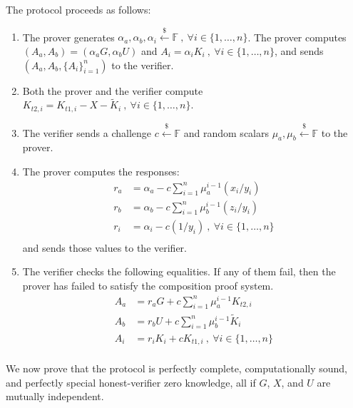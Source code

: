 \documentclass{article}
\theoremstyle{plain}
\theoremstyle{remark}
\begin{document}
The protocol proceeds as follows:
\begin{enumerate}
\item The prover generates $\alpha_a, \alpha_b, \alpha_i \xleftarrow{\$}\mathbb{F}\ ,\ \forall i\in\{1,\ldots,n\}$. The prover computes $(A_a, A_b) = (\alpha_a G, \alpha_b U)$ and $A_{i}=\alpha_i K_i\ ,\ \forall i\in\{1,\ldots,n\}$, and sends $(A_a, A_b, \{A_i\}_{i=1}^n)$ to the verifier.
\item Both the prover and the verifier compute $K_{t2,i} = K_{t1,i} - X - \tilde{K}_i\ ,\ \forall i\in\{1,\ldots,n\}$.
\item The verifier sends a challenge $c\xleftarrow{\$}\mathbb{F}$ and random scalars $\mu_a,\mu_b\xleftarrow{\$}\mathbb{F}$ to the prover.
\item The prover computes the responses:
\begin{align*}
r_{a} &= \alpha_a - c \sum_{i=1}^{n}{\mu_a^{i-1} (x_i/y_i)} \\
r_{b} &= \alpha_b - c \sum_{i=1}^{n}{\mu_b^{i-1}(z_i/y_i)} \\
r_{i} &= \alpha_i - c (1/y_i)\ ,\ \forall i\in\{1,\ldots,n\}\\
\end{align*}
and sends those values to the verifier.
\item The verifier checks the following equalities. If any of them fail, then the prover has failed to satisfy the composition proof system.
\begin{align*}
A_{a} &= r_a G + c \sum_{i=1}^{n}{\mu_a^{i-1} K_{t2,i}} \\
A_{b} &= r_b U + c \sum_{i=1}^{n}{\mu_b^{i-1} \tilde{K}_i} \\
A_{i} &= r_i K_i + c K_{t1,i}\ ,\ \forall i\in\{1,\ldots,n\}\\
\end{align*}
\end{enumerate}
We now prove that the protocol is perfectly complete, computationally sound, and perfectly special honest-verifier zero knowledge, all if $G$, $X$, and $U$ are mutually independent.
\end{document}
